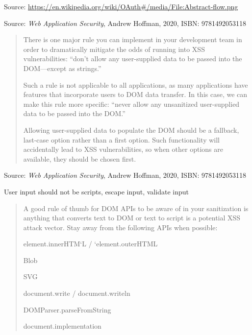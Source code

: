 \documentclass[Screen16to9,17pt]{foils}
\begin{document}

Source: \url{https://en.wikipedia.org/wiki/OAuth#/media/File:Abstract-flow.png}




Source: \emph{Web Application Security}, Andrew Hoffman, 2020, ISBN: 9781492053118




\begin{quote}
There is one major rule you can implement in your development team in order to dramatically mitigate the odds of running into XSS vulnerabilities: “don’t allow any user-supplied data to be passed into the DOM—except as strings.”

Such a rule is not applicable to all applications, as many applications have features that incorporate users to DOM data transfer. In this case, we can make this rule more specific: “never allow any unsanitized user-supplied data to be passed into the DOM.”

Allowing user-supplied data to populate the DOM should be a fallback, last-case option rather than a first option. Such functionality will accidentally lead to XSS vulnerabilities, so when other options are available, they should be chosen first.
\end{quote}
Source: \emph{Web Application Security}, Andrew Hoffman, 2020, ISBN: 9781492053118

\begin{list2}
\item User input should not be scripts, escape input, validate input
\end{list2}




\begin{quote}
A good rule of thumb for DOM APIs to be aware of in your sanitization is anything
that converts text to DOM or text to script is a potential XSS attack vector.
Stay away from the following APIs when possible:
\begin{list2}
\item element.innerHTM`L / `element.outerHTML
\item Blob
\item SVG
\item document.write / document.writeln
\item DOMParser.parseFromString
\item document.implementation
\end{list2}
\end{quote}
\end{document}
